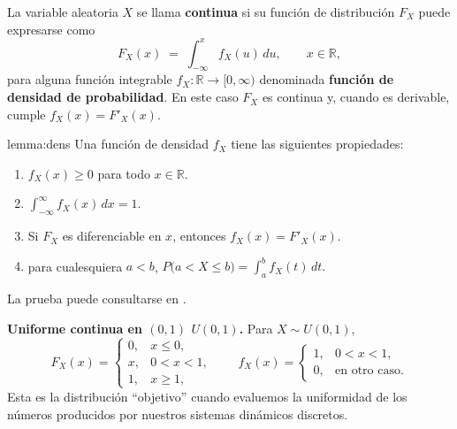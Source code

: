 \documentclass[../Main.tex]{subfiles}
\begin{document}
\begin{definition}{}{}
La variable aleatoria $X$ se llama \textbf{continua} si su función de
distribución $F_X$ puede expresarse como
\[
    F_X(x)\;=\;\int_{-\infty}^{x} f_X(u)\,du,
    \qquad x\in\mathbb R,
\]
para alguna función integrable
$f_X:\mathbb R\to[0,\infty)$
denominada \textbf{función de densidad de probabilidad}. 
En este caso $F_X$ es continua y, cuando es derivable,
cumple $f_X(x)=F'_X(x)$.
\end{definition}

\begin{lemma}{}{lemma:dens}
Una función de densidad \(f_X\) tiene las siguientes propiedades:
\begin{enumerate}
    \item \(f_X(x)\ge 0\) para todo \(x\in\mathbb R\).
    \item \(\displaystyle \int_{-\infty}^{\infty} f_X(x)\,dx = 1\).
    \item Si \(F_X\) es diferenciable en \(x\), entonces
          \(f_X(x)=F'_X(x)\).
    \item para cualesquiera $a<b$,
\(
    P\bigl(a<X\le b\bigr)=\int_{a}^{b} f_X(t)\,dt.
\)
\end{enumerate}
La prueba puede consultarse en \cite{grimmett2001probability}.
\end{lemma}



\begin{example}{}{}
 \textbf{Uniforme continua en \((0,1)\) \(U(0,1)\).}  
          Para \(X\sim U(0,1)\),
          \[
              F_X(x)=
              \begin{cases}
                  0, & x\le 0,\\[4pt]
                  x, & 0<x<1,\\[4pt]
                  1, & x\ge 1,
              \end{cases}
              \qquad
              f_X(x)=
              \begin{cases}
                  1, & 0<x<1,\\[4pt]
                  0, & \text{en otro caso.}
              \end{cases}
          \]
          Esta es la distribución “objetivo” cuando evaluemos la uniformidad
          de los números producidos por nuestros sistemas dinámicos discretos.
\end{example}
\end{document}
